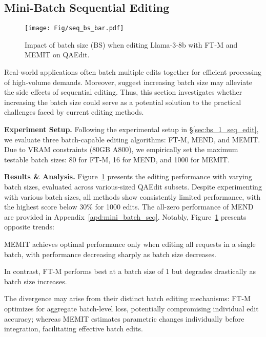 \subsection{Mini-Batch Sequential Editing}

\begin{figure}
    \centering
    \texttt{[image: Fig/seq\_bs\_bar.pdf]}
    \captionsetup{skip=0pt}
    \caption{Impact of batch size (BS) when editing Llama-3-8b with FT-M and MEMIT on QAEdit.}
    \label{fig:seq_batch}
\end{figure}


Real-world applications often batch multiple edits together for efficient processing of high-volume demands. 
Moreover, \citet{pan2024whyhas} suggest increasing batch size may alleviate the side effects of sequential editing.
Thus, this section investigates whether increasing the batch size could serve as a potential solution to the practical challenges faced by current editing methods.


\noindent \textbf{Experiment Setup.}
Following the experimental setup in \S\ref{sec:bs_1_seq_edit}, we evaluate three batch-capable editing algorithms: FT-M, MEND, and MEMIT.
Due to VRAM constraints (80GB A800), we empirically set the maximum testable batch sizes: 80 for FT-M, 16 for MEND, and 1000 for MEMIT.


\noindent \textbf{Results \& Analysis.} 
Figure~\ref{fig:seq_batch} presents the editing performance with varying batch sizes, evaluated across various-sized QAEdit subsets.
Despite experimenting with various batch sizes, all methods show consistently limited performance, with the highest score below 30\% for 1000 edits.
The all-zero performance of MEND are provided in Appendix~\ref{apd:mini_batch_seq}.
Notably, Figure~\ref{fig:seq_batch} presents opposite trends:
\begin{enumerate*}[label=\roman*)]
    \item MEMIT achieves optimal performance only when editing all requests in a single batch, with performance decreasing sharply as batch size decreases.
    \item In contrast, FT-M performs best at a batch size of 1 but  degrades drastically  as batch size increases.
\end{enumerate*}
The divergence may arise from their distinct batch editing mechanisms: FT-M optimizes for aggregate batch-level loss, potentially compromising individual edit accuracy; whereas MEMIT estimates parametric changes individually before integration, facilitating effective batch edits.

